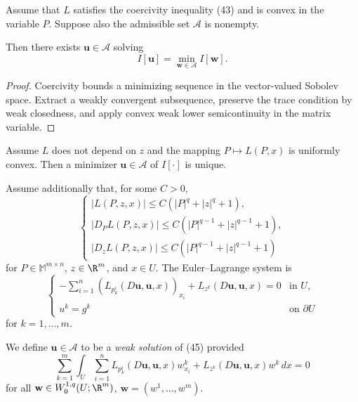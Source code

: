 \begin{theorem}
\label{thm:existence-minimizer-systems}
Assume that $L$ satisfies the coercivity inequality (43) and is convex in the variable $P$. Suppose also the admissible set $\mathcal{A}$ is nonempty.

Then there exists $\mathbf{u} \in \mathcal{A}$ solving
\[
I[\mathbf{u}] = \min_{\mathbf{w} \in \mathcal{A}} I[\mathbf{w}].
\]
\end{theorem}

\begin{proof}
\sketch Coercivity bounds a minimizing sequence in the vector-valued Sobolev space. Extract a weakly convergent subsequence, preserve the trace condition by weak closedness, and apply convex weak lower semicontinuity in the matrix variable.
\end{proof}

\begin{theorem}
\label{thm:uniqueness-minimizer-systems}
Assume $L$ does not depend on $z$ and the mapping $P \mapsto L(P, x)$ is uniformly convex. Then a minimizer $\mathbf{u} \in \mathcal{A}$ of $I[\cdot]$ is unique.
\end{theorem}

Assume additionally that, for some $C>0$,
\[
\begin{cases}
|L(P,z,x)|\leq C(|P|^q+|z|^q+1),\\
|D_PL(P,z,x)|\leq C(|P|^{q-1}+|z|^{q-1}+1),\\
|D_zL(P,z,x)|\leq C(|P|^{q-1}+|z|^{q-1}+1)
\end{cases}
\tag{44}
\]
for $P\in\mathbb M^{m\times n}$, $z\in\R^m$, and $x\in U$. The Euler--Lagrange system is
\[
\begin{cases}
-\displaystyle\sum_{i=1}^n(L_{p_k^i}(D\mathbf u,\mathbf u,x))_{x_i}
+L_{z^k}(D\mathbf u,\mathbf u,x)=0 & \text{in }U,\\
u^k=g^k & \text{on }\partial U
\end{cases}
\tag{45}
\]
for $k=1,\ldots,m$.

\begin{definition}
\label{def:weak-solution-euler-lagrange-system}
We define $\mathbf{u} \in \mathcal{A}$ to be a \textit{weak solution} of (45) provided
\[
\sum_{k=1}^m \int_U \sum_{i=1}^n L_{p_k^i}(D\mathbf{u}, \mathbf{u}, x)w^k_{x_i} + L_{z^k}(D\mathbf{u}, \mathbf{u}, x)w^k \, dx = 0
\]
for all $\mathbf{w} \in W_0^{1,q}(U; \R^m)$, $\mathbf{w} = (w^1, \ldots, w^m)$.
\end{definition}

